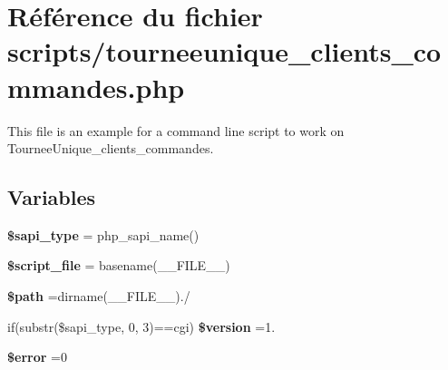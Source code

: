 \hypertarget{tourneeunique__clients__commandes_8php}{}\section{Référence du fichier scripts/tourneeunique\+\_\+clients\+\_\+commandes.php}
\label{tourneeunique__clients__commandes_8php}


This file is an example for a command line script to work on Tournee\+Unique\+\_\+clients\+\_\+commandes.  


\subsection*{Variables}
\begin{DoxyCompactItemize}
\item 
\mbox{\label{tourneeunique__clients__commandes_8php_a86e02f00a36d0fcbf274de973b2640d0}} 
{\bfseries \$sapi\+\_\+type} = php\+\_\+sapi\+\_\+name()
\item 
\mbox{\label{tourneeunique__clients__commandes_8php_a97b9f047572d6c50f29fbea522f6c17e}} 
{\bfseries \$script\+\_\+file} = basename(\+\_\+\+\_\+\+F\+I\+L\+E\+\_\+\+\_\+)
\item 
\mbox{\label{tourneeunique__clients__commandes_8php_a0a4baf0b22973c07685c3981f0d17fc4}} 
{\bfseries \$path} =dirname(\+\_\+\+\_\+\+F\+I\+L\+E\+\_\+\+\_\+).\textquotesingle{}/\textquotesingle{}
\item 
\mbox{\label{tourneeunique__clients__commandes_8php_a0a351317886caa2358df1658880c0c78}} 
if(substr(\$sapi\+\_\+type, 0, 3)==\textquotesingle{}cgi\textquotesingle{}) {\bfseries \$version} =\textquotesingle{}1.\textquotesingle{}
\item 
\mbox{\label{tourneeunique__clients__commandes_8php_aeba2ab722cedda53dbb7ec1a59f45550}} 
{\bfseries \$error} =0
\item 
\mbox{\label{tourneeunique__clients__commandes_8php_a2b87986264c1ca3cddb96a106af7b37a}} 

\end{DoxyCompactItemize}
